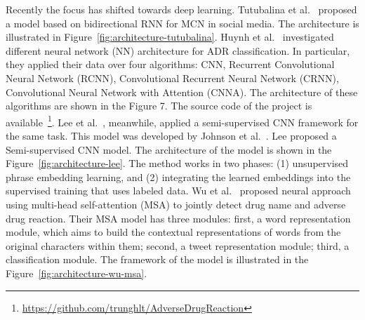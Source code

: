 Recently the focus has shifted towards deep learning. Tutubalina et al.~\cite{TUTUBALINA201893} proposed a model based on bidirectional RNN for MCN in social media. The architecture is illustrated in Figure~\ref{fig:architecture-tutubalina}. Huynh et al.~\cite{huynh2016adverse} investigated different neural network (NN) architecture for ADR classification. In particular, they applied their data over four algorithms: CNN, Recurrent Convolutional Neural Network (RCNN), Convolutional Recurrent Neural Network (CRNN), Convolutional Neural Network with Attention (CNNA). The architecture of these algorithms are shown in the Figure 7. The source code of the project is available~\footnote{\url{https://github.com/trunghlt/AdverseDrugReaction}}. Lee et al.~\cite{lee2017adverse}, meanwhile, applied a semi-supervised CNN framework for the same task. This model was developed by Johnson et al.~\cite{johnson2015semi}. Lee proposed a Semi-supervised CNN model. The architecture of the model is shown in the Figure~\ref{fig:architecture-lee}. The method works in two phases: (1) unsupervised phrase embedding learning, and (2) integrating the learned embeddings into the supervised training that uses labeled data. Wu et al.~\cite{wu2018detecting, wu2019msa} proposed neural approach using multi-head self-attention (MSA) to jointly detect drug name and adverse drug reaction. Their MSA model has three modules: first, a word representation module, which aims to build the contextual representations of words from the original characters within them; second, a tweet representation module; third, a classification module. The framework of the model is illustrated in the Figure~\ref{fig:architecture-wu-msa}.

